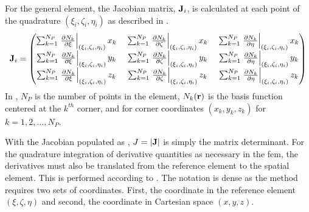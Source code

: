     For the general element, the Jacobian matrix, $\mathbf{J}_i$, is calculated at each
    point of the quadrature $(\xi_i,\zeta_i,\eta_i)$ as described in
    .
    \begin{equation}
      \label{eq:calcJacobian}
      \mathbf{J}_i = 
      \begin{pmatrix}
        \sum_{k=1}^{N_P} \left. \frac{\partial N_k}{\partial \xi}
          \right|_{(\xi_i,\zeta_i,\eta_i)} x_k   \; &
        \sum_{k=1}^{N_P} \left. \frac{\partial N_k}{\partial \zeta}
          \right|_{(\xi_i,\zeta_i,\eta_i)} x_k   \; &
        \sum_{k=1}^{N_P} \left. \frac{\partial N_k}{\partial \eta} 
          \right|_{(\xi_i,\zeta_i,\eta_i)} x_k   \\
        \sum_{k=1}^{N_P} \left. \frac{\partial N_k}{\partial \xi}
          \right|_{(\xi_i,\zeta_i,\eta_i)} y_k   \; &
        \sum_{k=1}^{N_P} \left. \frac{\partial N_k}{\partial \zeta} 
          \right|_{(\xi_i,\zeta_i,\eta_i)} y_k   \; &
        \sum_{k=1}^{N_P} \left. \frac{\partial N_k}{\partial \eta} 
          \right|_{(\xi_i,\zeta_i,\eta_i)} y_k   \\
        \sum_{k=1}^{N_P} \left. \frac{\partial N_k}{\partial \xi}
          \right|_{(\xi_i,\zeta_i,\eta_i)} z_k   \; &
        \sum_{k=1}^{N_P} \left. \frac{\partial N_k}{\partial \zeta} 
          \right|_{(\xi_i,\zeta_i,\eta_i)} z_k   \; &
        \sum_{k=1}^{N_P} \left. \frac{\partial N_k}{\partial \eta} 
          \right|_{(\xi_i,\zeta_i,\eta_i)} z_k   
      \end{pmatrix}
    \end{equation}
    In , $N_P$ is the number of points in the element, 
    $N_k(\mathbf{r})$ is the basis function centered at the $k^{th}$ corner, and 
    for corner coordinates $(x_k,y_k,z_k)$ for $k = 1,2,\ldots,N_P$.

    With the Jacobian populated as , $J=\lvert\mathbf{J}\rvert$
    is simply the matrix determinant. For the quadrature integration of 
    derivative quantities as necessary in the \gls{fem}, the derivatives must 
    also be translated from the reference element to the spatial element. This 
    is performed according to . The notation 
    is dense as the method requires two sets of coordinates. First, the 
    coordinate in the reference element $(\xi,\zeta,\eta)$ and second, the 
    coordinate in Cartesian space $(x,y,z)$.

